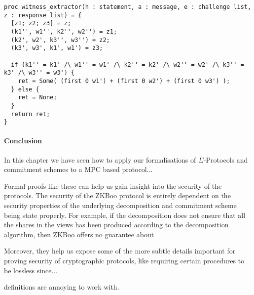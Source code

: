 \begin{lstlisting}[float,label=lst:zbkoo_extractor,caption= ZKBoo witness extractor]
proc witness_extractor(h : statement, a : message, e : challenge list, z : response list) = {
  [z1; z2; z3] = z;
  (k1'', w1'', k2'', w2'') = z1;
  (k2', w2', k3'', w3'') = z2;
  (k3', w3', k1', w1') = z3;

  if (k1'' = k1' /\ w1'' = w1' /\ k2'' = k2' /\ w2'' = w2' /\ k3'' = k3' /\ w3'' = w3') {
    ret = Some( (first 0 w1') + (first 0 w2') + (first 0 w3') );
  } else {
    ret = None;
  }
  return ret;
}
\end{lstlisting}



\paragraph{Conclusion}
In this chapter we have seen how to apply our formalisations of
$\Sigma$-Protocols and commitment schemes to a MPC based protocol...

Formal proofs like these can help us gain insight into the security of the
protocols. The security of the ZKBoo protocol is entirely dependent on the
security properties of the underlying decomposition and commitment scheme being
state properly. For example, if the decomposition does not ensure that all the
shares in the views has been produced according to the decomposition algorithm,
then ZKBoo offers no guarantee about

Moreover, they help us expose some of the more subtle details important for
proving security of cryptographic protocols, like requiring certain procedures
to be lossless since...


definitions are annoying to work with.


